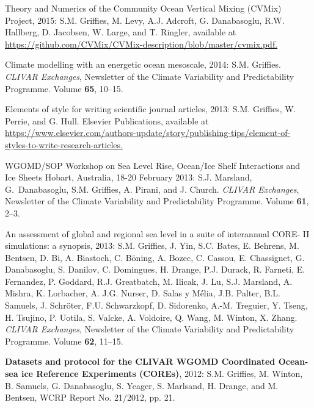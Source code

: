 \begin{etaremune}
  
\item Theory and Numerics of the Community Ocean Vertical Mixing (CVMix) Project, 2015: S.M. Grif\/f\/ies, M. Levy, A.J. Adcroft, G. Danabasoglu, R.W. Hallberg, D. Jacobsen, W. Large, and T. Ringler, available at \href{https://github.com/CVMix/CVMix-description/blob/master/cvmix.pdf}{https://github.com/CVMix/CVMix-description/blob/master/cvmix.pdf.}

\item Climate modelling with an energetic ocean mesoscale, 2014: S.M. Grif\/f\/ies.  {\em CLIVAR Exchanges}, Newsletter of the Climate Variability and Predictability Programme.  Volume {\bf 65}, 10--15.

\item Elements of style for writing scientific journal articles, 2013: S.M. Grif\/f\/ies, W. Perrie, and G. Hull. Elsevier Publications, available at \href{https://www.elsevier.com/authors-update/story/publishing-tips/element-of-styles-to-write-research-articles}{https://www.elsevier.com/authors-update/story/publishing-tips/element-of-styles-to-write-research-articles.}

\item WGOMD/SOP Workshop on Sea Level Rise, Ocean/Ice Shelf Interactions and Ice Sheets Hobart, Australia, 18-20 February 2013: S.J. Marsland, G.\ Danabasoglu, S.M. Grif\/f\/ies, A. Pirani, and J. Church.  {\em CLIVAR Exchanges}, Newsletter of the Climate Variability and Predictability Programme.  Volume {\bf 61}, 2--3.

\item An assessment of global and regional sea level in a suite of interannual CORE- II simulations: a synopsis, 2013:  S.M. Grif\/f\/ies, J. Yin, S.C. Bates, E. Behrens, M.  Bentsen, D. Bi, A. Biastoch, C. B\"{o}ning, A. Bozec, C. Cassou, E. Chassignet, G. Danabasoglu, S. Danilov, C. Domingues, H. Drange, P.J. Durack, R. Farneti, E. Fernandez, P. Goddard, R.J. Greatbatch, M. Ilicak, J. Lu, S.J. Marsland, A. Mishra, K. Lorbacher, A. J.G. Nurser, D. Salas y M\'{é}lia, J.B. Palter, B.L. Samuels,
  J. Schr\"{o}ter, F.U. Schwarzkopf, D. Sidorenko, A.-M. Treguier, Y. Tseng, H. Tsujino, P.  Uotila, S. Valcke, A. Voldoire, Q. Wang, M. Winton, X. Zhang. {\em CLIVAR Exchanges}, Newsletter of the Climate Variability and Predictability Programme. Volume {\bf 62},
  11--15.

\item {\bf Datasets and protocol for the CLIVAR WGOMD Coordinated Ocean-sea ice Reference Experiments (COREs)}, 2012: S.M. Grif\/f\/ies, M. Winton, B. Samuels, G. Danabasoglu, S. Yeager, S. Marlsand, H.  Drange, and M. Bentsen, WCRP Report No. 21/2012, pp. 21.


\end{etaremune}
